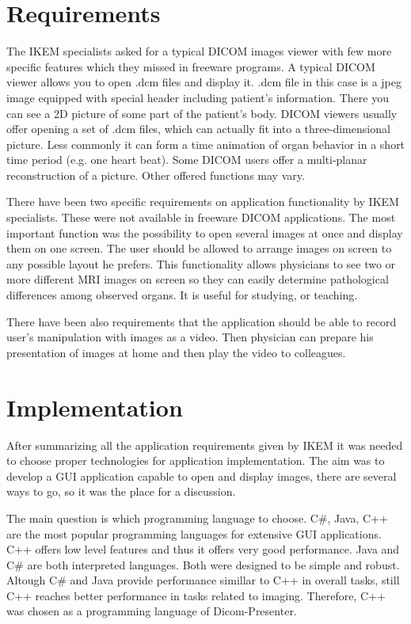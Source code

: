 \section{Requirements}
\label{requirements}
The IKEM specialists asked for a typical DICOM images viewer with few more specific features which they missed in freeware programs. A typical DICOM viewer allows you to open .dcm files and display it. .dcm file in this case is a jpeg image equipped with special header including patient's information. There you can see a 2D picture of some part of the patient's body. DICOM viewers usually offer opening a set of .dcm files, which can actually fit into a three-dimensional picture. Less commonly it can form a time animation of organ behavior in a short time period (e.g. one heart beat). Some DICOM users offer a multi-planar reconstruction of a picture. Other offered functions may vary.

There have been two specific requirements on application functionality by IKEM specialists. These were not available in freeware DICOM applications. The most important function was the possibility to open several images at once and display them on one screen. The user should be allowed to arrange images on screen to any possible layout he prefers. This functionality allows physicians to see two or more different MRI images on screen so they can easily determine pathological differences among observed organs. It is useful for studying, or teaching.

There have been also requirements that the application should be able to record user's manipulation with images as a video. Then physician can prepare his presentation of images at home and then play the video to colleagues.

\section{Implementation}
After summarizing all the application requirements given by IKEM it was needed to choose proper technologies for application implementation. The aim was to develop a GUI application capable to open and display images, there are several ways to go, so it was the place for a discussion. 

The main question is which programming language to choose. C\#, Java, C++ are the most popular programming languages for extensive GUI applications. C++ offers low level features and thus it offers very good performance. Java and C\# are both interpreted languages. Both were designed to be simple and robust. Altough C\# and Java provide performance simillar to C++ in overall tasks, still C++ reaches better performance in tasks related to imaging. Therefore, C++ was chosen as a programming language of Dicom-Presenter.

